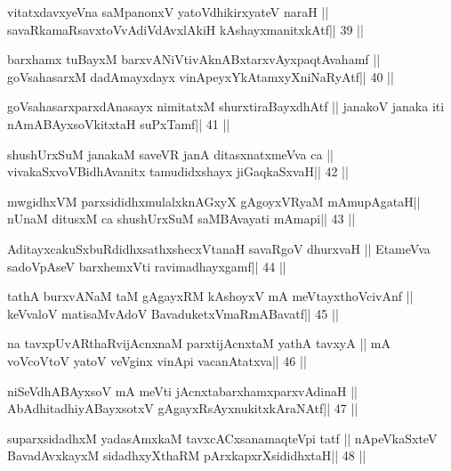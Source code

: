\begin{shl}
vitatxdavxyeVna saMpanonxV yatoV\s dhikirxyateV naraH ||
savaRkamaRsavxtoV\s vAdiVdAvxlAkiH kAshayxmanitxkAtf\hfill || 39 ||
\end{shl}

\begin{shl}
barxhamx tuBayxM barxvANiVtivAknABxtarxvAyxpaqtAvahamf ||
goVsahasarxM dadAmayxdayx vinA\s peyxYkAtamxyXniNaRyAtf\hfill || 40 ||
\end{shl}

\begin{shl}
goVsahasarxparxdAnasayx nimitatxM shurxtiraBayxdhAtf ||
janakoV janaka iti nAmABAyxsoVkitxtaH suPxTamf\hfill || 41 ||
\end{shl}

\begin{shl}
shushUrxSuM janakaM saveVR janA ditasxnatxmeVva ca ||
vivakaSxvoV\s BidhAvanitx tamudidxshayx jiGaqkaSxvaH\hfill || 42 ||
\end{shl}

\begin{shl}
mwgidhxVM parxsididhxmulalxknAGxyX gAgoyxVR\s yaM mAmupAgataH||
nUnaM ditusxM ca shushUrxSuM saMBAvayati mAmapi\hfill || 43 ||
\end{shl}

\begin{shl}
AditayxcakuSxbuRdidhxsathxshecxVtanaH savaRgoV dhurxvaH ||
EtameVva sadoVpAseV barxhemxVti ravimadhayxgamf\hfill || 44 ||
\end{shl}

\begin{shl}
tathA burxvANaM taM gAgayxRM kAshoyxV mA meVtayxthoVcivAnf ||
keVvaloV matisaMvAdoV BavaduketxVmaRmABavatf\hfill || 45 ||
\end{shl}

\begin{shl}
na tavxpUvARthaRvijAcnxnaM parxtijAcnxtaM yathA tavxyA ||
mA voVcoV\s toV yatoV veVginx vinA\s pi vacanAtatxva\hfill || 46 ||
\end{shl}

\begin{shl}
niSeVdhABAyxsoV mA meVti jAcnxtabarxhamxparxvAdinaH ||
AbAdhitadhiyA\s BayxsotxV gAgayxRsAyxnukitxkAraNAtf\hfill || 47 ||
\end{shl}

\begin{shl}
suparxsidadhxM yadasAmxkaM tavxcACxsanamaqteV\s pi tatf ||
nApeVkaSxteV BavadAvxkayxM sidadhxyXthaRM pArxkapxrXsididhxtaH\hfill || 48 ||
\end{shl}

